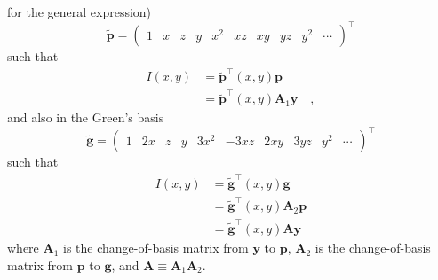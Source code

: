 \documentclass[12pt]{report}
\begin{document}
\citet{2019AJ....157...64L} for the general expression)
\begin{equation}
    \tilde{\boldsymbol{p}}=\left(\begin{array}{llllllllll}
        1 & x & z & y & x^{2} & x z & x y & y z & y^{2} & \cdots
    \end{array}\right)^{\top}
\end{equation}
such that
\begin{align}
    I(x, y) & =\tilde{\mathbf{p}}^{\top}(x, y) \mathbf{p}                    \\
            & =\tilde{\mathbf{p}}^{\top}(x, y) \mathbf{A}_1 \mathbf{y}\quad,
    \label{eq:intensity_poly_basis}
\end{align}
and also in the Green's basis
\begin{equation}
    \tilde{\boldsymbol{g}}=\left(\begin{array}{llllllllll}
        1 & 2 x & z & y & 3 x^{2} & -3 x z & 2 x y & 3 y z & y^{2} & \cdots
    \end{array}\right)^{\top}
\end{equation}
such that
\begin{align}
    I(x, y) & =\tilde{\mathbf{g}}^{\top}(x, y) \mathbf{g}              \\
            & =\tilde{\mathbf{g}}^{\top}(x, y) \mathbf{A}_2 \mathbf{p} \\
            & =\tilde{\mathbf{g}}^{\top}(x, y) \mathbf{A} \mathbf{y}
\end{align}
where $\mathbf{A}_1$ is the change-of-basis matrix from $\mathbf{y}$ to $\mathbf{p}$,
$\mathbf{A}_2$ is the change-of-basis matrix from $\mathbf{p}$ to $\mathbf{g}$, and
$\mathbf{A}\equiv \mathbf{A}_1 \mathbf{A}_2$.
\end{document}
